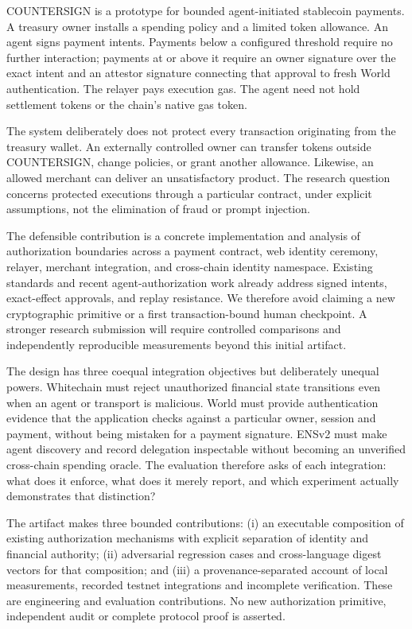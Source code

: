 \documentclass[11pt]{article}
\begin{document}
COUNTERSIGN is a prototype for bounded agent-initiated stablecoin payments. A treasury owner installs a spending policy and a limited token allowance. An agent signs payment intents. Payments below a configured threshold require no further interaction; payments at or above it require an owner signature over the exact intent and an attestor signature connecting that approval to fresh World authentication. The relayer pays execution gas. The agent need not hold settlement tokens or the chain's native gas token.

The system deliberately does not protect every transaction originating from the treasury wallet. An externally controlled owner can transfer tokens outside COUNTERSIGN, change policies, or grant another allowance. Likewise, an allowed merchant can deliver an unsatisfactory product. The research question concerns protected executions through a particular contract, under explicit assumptions, not the elimination of fraud or prompt injection.

The defensible contribution is a concrete implementation and analysis of authorization boundaries across a payment contract, web identity ceremony, relayer, merchant integration, and cross-chain identity namespace. Existing standards and recent agent-authorization work already address signed intents, exact-effect approvals, and replay resistance. We therefore avoid claiming a new cryptographic primitive or a first transaction-bound human checkpoint. A stronger research submission will require controlled comparisons and independently reproducible measurements beyond this initial artifact.

The design has three coequal integration objectives but deliberately unequal powers. Whitechain must reject unauthorized financial state transitions even when an agent or transport is malicious. World must provide authentication evidence that the application checks against a particular owner, session and payment, without being mistaken for a payment signature. ENSv2 must make agent discovery and record delegation inspectable without becoming an unverified cross-chain spending oracle. The evaluation therefore asks of each integration: what does it enforce, what does it merely report, and which experiment actually demonstrates that distinction?

The artifact makes three bounded contributions: (i) an executable composition of existing authorization mechanisms with explicit separation of identity and financial authority; (ii) adversarial regression cases and cross-language digest vectors for that composition; and (iii) a provenance-separated account of local measurements, recorded testnet integrations and incomplete verification. These are engineering and evaluation contributions. No new authorization primitive, independent audit or complete protocol proof is asserted.
\end{document}
